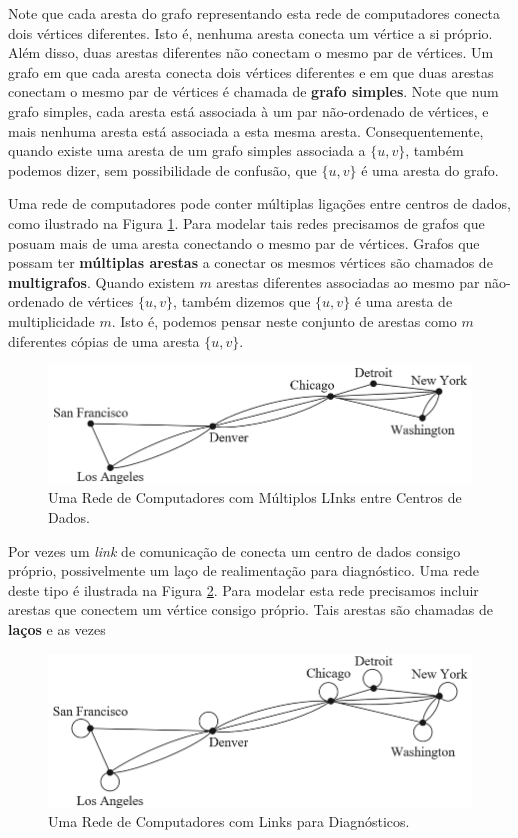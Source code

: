 Note que cada aresta do grafo representando esta rede de computadores conecta
dois vértices diferentes. Isto é, nenhuma aresta conecta um vértice a si
próprio. Além disso, duas arestas diferentes não conectam o mesmo par de
vértices. Um grafo em que cada aresta conecta dois vértices diferentes e em que
duas arestas conectam o mesmo par de vértices é chamada de \textbf{grafo
simples}. Note que num grafo simples, cada aresta está associada à um par
não-ordenado de vértices, e mais nenhuma aresta está associada a esta mesma
aresta. Consequentemente, quando existe uma aresta de um grafo simples associada
a $\{u,v\}$, também podemos dizer, sem possibilidade de confusão, que $\{u,v\}$
é uma aresta do grafo.

Uma rede de computadores pode conter múltiplas ligações entre centros de dados,
como ilustrado na Figura \ref{fig52}. Para modelar tais redes precisamos de
grafos que posuam mais de uma aresta conectando o mesmo par de vértices. Grafos
que possam ter \textbf{múltiplas arestas} a conectar os mesmos vértices são
chamados de \textbf{multigrafos}. Quando existem $m$ arestas diferentes
associadas ao mesmo par não-ordenado de vértices $\{u,v\}$, também dizemos que
$\{u,v\}$ é uma aresta de multiplicidade $m$. Isto é, podemos pensar neste
conjunto de arestas como $m$ diferentes cópias de uma aresta $\{u,v\}$.

\begin{figure}[H]
	\centering
	\includegraphics[scale=1]{chapter/imagens/52}
	\caption{Uma Rede de Computadores com Múltiplos LInks entre Centros de Dados.}
	\label{fig52}
\end{figure}

Por vezes um \textit{link} de comunicação de conecta um centro de dados consigo
próprio, possivelmente um laço de realimentação para diagnóstico. Uma rede deste
tipo é ilustrada na Figura \ref{fig53}. Para modelar esta rede precisamos
incluir arestas que conectem um vértice consigo próprio. Tais arestas são
chamadas de \textbf{laços} e as vezes

\begin{figure}[H]
	\centering
	\includegraphics[scale=1]{chapter/imagens/53}
	\caption{Uma Rede de Computadores com Links para Diagnósticos.}
	\label{fig53}
\end{figure}


